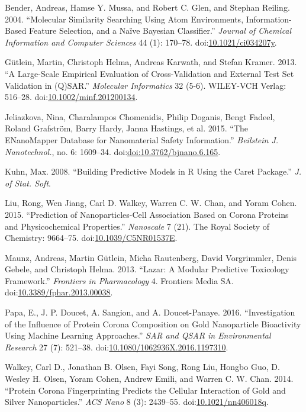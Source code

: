 \documentclass[utf8]{frontiersHLTH} %
\begin{document}
\hypertarget{refs}{}
\hypertarget{ref-Bender04}{}
Bender, Andreas, Hamse Y. Mussa, and Robert C. Glen, and Stephan
Reiling. 2004. ``Molecular Similarity Searching Using Atom Environments,
Information-Based Feature Selection, and a Naïve Bayesian Classifier.''
\emph{Journal of Chemical Information and Computer Sciences} 44 (1):
170--78.
doi:\href{https://doi.org/10.1021/ci034207y}{10.1021/ci034207y}.

\hypertarget{ref-Guxfctlein2013}{}
Gütlein, Martin, Christoph Helma, Andreas Karwath, and Stefan Kramer.
2013. ``A Large-Scale Empirical Evaluation of Cross-Validation and
External Test Set Validation in (Q)SAR.'' \emph{Molecular Informatics}
32 (5-6). WILEY-VCH Verlag: 516--28.
doi:\href{https://doi.org/10.1002/minf.201200134}{10.1002/minf.201200134}.

\hypertarget{ref-Jeliazkova15}{}
Jeliazkova, Nina, Charalampos Chomenidis, Philip Doganis, Bengt Fadeel,
Roland Grafström, Barry Hardy, Janna Hastings, et al. 2015. ``The
ENanoMapper Database for Nanomaterial Safety Information.''
\emph{Beilstein J. Nanotechnol.}, no. 6: 1609--34.
doi:\href{https://doi.org/doi:10.3762/bjnano.6.165}{doi:10.3762/bjnano.6.165}.

\hypertarget{ref-Kuhn08}{}
Kuhn, Max. 2008. ``Building Predictive Models in R Using the Caret
Package.'' \emph{J. of Stat. Soft}.

\hypertarget{ref-Liu15}{}
Liu, Rong, Wen Jiang, Carl D. Walkey, Warren C. W. Chan, and Yoram
Cohen. 2015. ``Prediction of Nanoparticles-Cell Association Based on
Corona Proteins and Physicochemical Properties.'' \emph{Nanoscale} 7
(21). The Royal Society of Chemistry: 9664--75.
doi:\href{https://doi.org/10.1039/C5NR01537E}{10.1039/C5NR01537E}.

\hypertarget{ref-Maunz2013}{}
Maunz, Andreas, Martin Gütlein, Micha Rautenberg, David Vorgrimmler,
Denis Gebele, and Christoph Helma. 2013. ``Lazar: A Modular Predictive
Toxicology Framework.'' \emph{Frontiers in Pharmacology} 4. Frontiers
Media SA.
doi:\href{https://doi.org/10.3389/fphar.2013.00038}{10.3389/fphar.2013.00038}.

\hypertarget{ref-Papa16}{}
Papa, E., J. P. Doucet, A. Sangion, and A. Doucet-Panaye. 2016.
``Investigation of the Influence of Protein Corona Composition on Gold
Nanoparticle Bioactivity Using Machine Learning Approaches.'' \emph{SAR
and QSAR in Environmental Research} 27 (7): 521--38.
doi:\href{https://doi.org/10.1080/1062936X.2016.1197310}{10.1080/1062936X.2016.1197310}.

\hypertarget{ref-Walkey14}{}
Walkey, Carl D., Jonathan B. Olsen, Fayi Song, Rong Liu, Hongbo Guo, D.
Wesley H. Olsen, Yoram Cohen, Andrew Emili, and Warren C. W. Chan. 2014.
``Protein Corona Fingerprinting Predicts the Cellular Interaction of
Gold and Silver Nanoparticles.'' \emph{ACS Nano} 8 (3): 2439--55.
doi:\href{https://doi.org/10.1021/nn406018q}{10.1021/nn406018q}.
\end{document}
